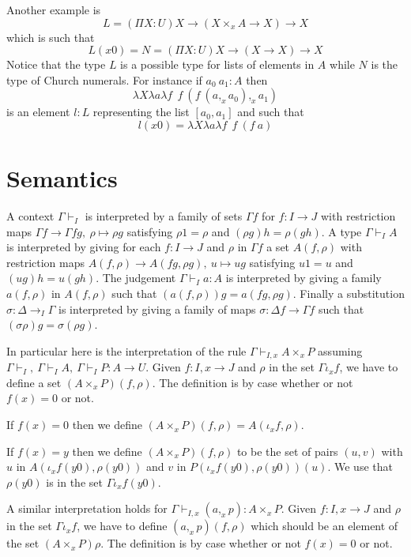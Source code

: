 \documentclass[10pt,a4paper]{article}
\begin{document}
\medskip

 Another example is
$$
L = (\Pi X:U)X\rightarrow (X\times_x A\rightarrow X)\rightarrow X
$$
which is such that
$$
L(x0) = N = (\Pi X:U)X\rightarrow (X\rightarrow X)\rightarrow X
$$
Notice that the type $L$ is a possible type for lists of elements in $A$ while
$N$ is the type of Church numerals. For instance if $a_0~a_1:A$ then
$$\lambda X\lambda a\lambda f~~f~(f~(a,_x a_0),_x a_1)$$
is an element $l:L$ representing the list $[a_0,a_1]$ and such that
$$l(x0) = \lambda X\lambda a\lambda f~~f~(f~a)$$

\section{Semantics}

 A context $\Gamma\vdash_I$ is interpreted
by a family of sets $\Gamma f$ for $f:I\rightarrow J$ with restriction maps
$\Gamma f\rightarrow \Gamma fg,~\rho\longmapsto \rho g$ satisfying $\rho 1 = \rho$
and $(\rho  g) h = \rho (gh)$. A type $\Gamma\vdash_I A$ is interpreted by giving
for each $f:I\rightarrow J$ and $\rho$ in $\Gamma f$ a set $A(f,\rho)$ with restriction
maps $A(f,\rho)\rightarrow A(fg,\rho g),~u\longmapsto u g$ satisfying $u1 = u$ and $(ug) h = u(gh)$.
The judgement $\Gamma\vdash _I a:A$ is interpreted by giving a family $a(f,\rho)$ in $A(f,\rho)$ such
that $(a(f,\rho))g = a(fg,\rho g)$. Finally a substitution $\sigma :\Delta\rightarrow_I \Gamma$
is interpreted by giving a family of maps $\sigma:\Delta f\rightarrow \Gamma f$ such that
$(\sigma\rho) g = \sigma (\rho g)$.

\medskip

 In particular here is the interpretation of the rule $\Gamma\vdash_{I,x} A\times_x P$
assuming $\Gamma\vdash_I,~\Gamma\vdash_I A,~\Gamma\vdash_I P:A\rightarrow U$.
Given $f:I,x\rightarrow J$ and $\rho$ in the set $\Gamma \iota_x f$, we have to define
a set $(A\times_x P)(f,\rho)$. The definition is by case whether or not $f(x) = 0$ or not.

 If $f(x) = 0$ then we define $(A\times_x P)(f,\rho) = A(\iota_x f,\rho)$.

 If $f(x) = y$ then we define $(A\times_x P)(f,\rho)$ to be the set of pairs
$(u,v)$ with $u$ in $A(\iota_x f(y0),\rho(y0))$ and $v$ in $P(\iota_xf(y0),\rho(y0))(u)$. We use that $\rho(y0)$
is in the set $\Gamma\iota_x f (y0)$.

\medskip
 
 A similar interpretation holds for $\Gamma\vdash_{I,x} (a,_x p):A\times_x P$.
Given $f:I,x\rightarrow J$ and $\rho$ in the set $\Gamma \iota_x f$, we have to define
$(a,_x p)(f,\rho)$ which should be an element of the set $(A\times_x P)\rho$. 
The definition is by case whether or not $f(x) = 0$ or not.
\end{document}
